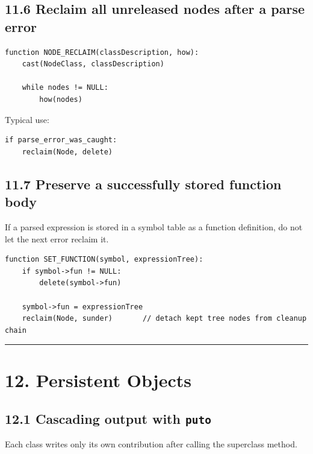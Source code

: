 \documentclass[11pt]{article}
\begin{document}
\subsection{11.6 Reclaim all unreleased nodes after a parse
error}\label{reclaim-all-unreleased-nodes-after-a-parse-error}

\begin{verbatim}
function NODE_RECLAIM(classDescription, how):
    cast(NodeClass, classDescription)

    while nodes != NULL:
        how(nodes)
\end{verbatim}

Typical use:

\begin{verbatim}
if parse_error_was_caught:
    reclaim(Node, delete)
\end{verbatim}

\subsection{11.7 Preserve a successfully stored function
body}\label{preserve-a-successfully-stored-function-body}

If a parsed expression is stored in a symbol table as a function
definition, do not let the next error reclaim it.

\begin{verbatim}
function SET_FUNCTION(symbol, expressionTree):
    if symbol->fun != NULL:
        delete(symbol->fun)

    symbol->fun = expressionTree
    reclaim(Node, sunder)       // detach kept tree nodes from cleanup chain
\end{verbatim}

\begin{center}\rule{0.5\linewidth}{0.5pt}\end{center}

\section{12. Persistent Objects}\label{persistent-objects}

\subsection{\texorpdfstring{12.1 Cascading output with
\texttt{puto}}{12.1 Cascading output with puto}}\label{cascading-output-with-puto}

Each class writes only its own contribution after calling the superclass
method.
\end{document}
